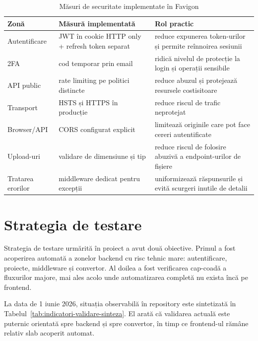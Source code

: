 \begin{table}[H]
  \centering
  \caption{Măsuri de securitate implementate în Favigon}
  \label{tab:masuri-securitate}
  \renewcommand{\arraystretch}{1.2}
  \begin{tabularx}{\textwidth}{>{\RaggedRight\arraybackslash}p{4cm}YY}
    \toprule
    \textbf{Zonă} & \textbf{Măsură implementată} & \textbf{Rol practic} \\
    \midrule
    Autentificare & JWT în cookie HTTP only + refresh token separat & reduce expunerea token-urilor și permite reînnoirea sesiunii \\
    2FA & cod temporar prin email & ridică nivelul de protecție la login și operații sensibile \\
    API public & rate limiting pe politici distincte & reduce abuzul și protejează resursele costisitoare \\
    Transport & HSTS și HTTPS în producție & reduce riscul de trafic neprotejat \\
    Browser/API & CORS configurat explicit & limitează originile care pot face cereri autentificate \\
    Upload-uri & validare de dimensiune și tip & reduce riscul de folosire abuzivă a endpoint-urilor de fișiere \\
    Tratarea erorilor & middleware dedicat pentru excepții & uniformizează răspunsurile și evită scurgeri inutile de detalii \\
    \bottomrule
  \end{tabularx}
\end{table}

\section{Strategia de testare}

Strategia de testare urmărită în proiect a avut două obiective. Primul a fost acoperirea automată a zonelor backend cu risc tehnic mare: autentificare, proiecte, middleware și convertor. Al doilea a fost verificarea cap-coadă a fluxurilor majore, mai ales acolo unde automatizarea completă nu exista încă pe frontend.

La data de 1 iunie 2026, situația observabilă în repository este sintetizată în Tabelul~\ref{tab:indicatori-validare-sinteza}. El arată că validarea actuală este puternic orientată spre backend și spre convertor, în timp ce frontend-ul rămâne relativ slab acoperit automat.

